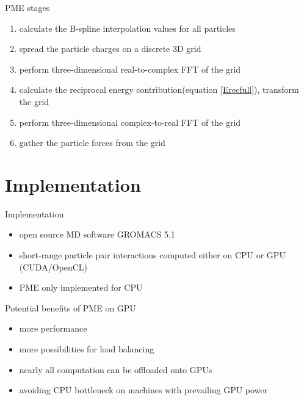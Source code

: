 \documentclass[11pt]{beamer}
\begin{document}
\begin{frame}{PME stages}
\begin{enumerate}
\item calculate the B-spline interpolation values for all particles
\item spread the particle charges on a discrete 3D grid
\item perform three-dimensional real-to-complex FFT of the grid
\item calculate the reciprocal energy contribution(equation \eqref{Erecfull}), transform the grid
\item perform three-dimensional complex-to-real FFT of the grid
\item gather the particle forces from the grid
\end{enumerate}
\end{frame}


\section{Implementation}
\begin{frame}{Implementation}
\begin{itemize}
\item open source MD software GROMACS 5.1
\item short-range particle pair interactions computed either on CPU or GPU (CUDA/OpenCL)
\item PME only implemented for CPU
\end{itemize}
\end{frame}

\begin{frame}{Potential benefits of PME on GPU}
\begin{itemize}
\item more performance
\item more possibilities for load balancing
\item nearly all computation can be offloaded onto GPUs
\item avoiding CPU bottleneck on machines with prevailing GPU power  
\end{itemize}
\end{frame}
\end{document}
